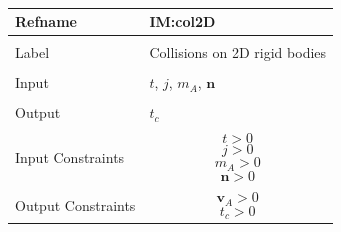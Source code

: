 \documentclass[12pt]{article}
\begin{document}
\par~

\noindent \begin{minipage}{\textwidth}
\begin{tabular}{p{} p{}}
\toprule \textbf{Refname} & \textbf{IM:col2D}
\label{IM:col2D}
\\ \midrule \\
Label & Collisions on 2D rigid bodies
        \\ \midrule \\
        Input & $t$, $j$, ${m_{A}}$, $\mathbf{n}$
                \\ \midrule \\
                Output & ${t_{c}}$
                         \\ \midrule \\
                         Input Constraints & \begin{displaymath}
                                             t>0
                                             \end{displaymath}
                                             \begin{displaymath}
                                             j>0
                                             \end{displaymath}
                                             \begin{displaymath}
                                             {m_{A}}>0
                                             \end{displaymath}
                                             \begin{displaymath}
                                             \mathbf{n}>0
                                             \end{displaymath}
                                             \\ \midrule \\
                                             Output Constraints & \begin{displaymath}
                                                                  {\mathbf{v}_{A}}>0
                                                                  \end{displaymath}
                                                                  \begin{displaymath}
                                                                  {t_{c}}>0

\end{displaymath}
\end{tabular}
\end{minipage}
\end{document}
